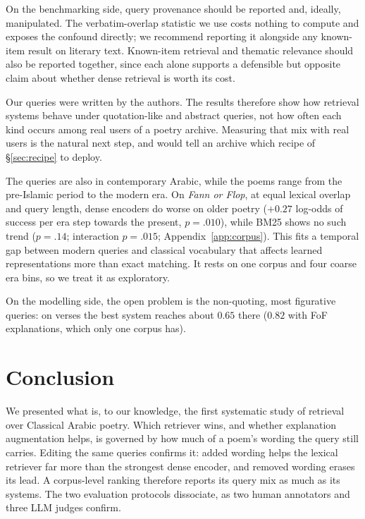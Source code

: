 \documentclass[11pt]{article}
\begin{document}
On the benchmarking side, query provenance should be reported and, ideally, manipulated. The verbatim-overlap statistic we use costs nothing to compute and exposes the confound directly; we recommend reporting it alongside any known-item result on literary text. Known-item retrieval and thematic relevance should also be reported together, since each alone supports a defensible but opposite claim about whether dense retrieval is worth its cost.

Our queries were written by the authors. The results therefore show how retrieval systems behave under quotation-like and abstract queries, not how often each kind occurs among real users of a poetry archive. Measuring that mix with real users is the natural next step, and would tell an archive which recipe of \S\ref{sec:recipe} to deploy.

The queries are also in contemporary Arabic, while the poems range from the pre-Islamic period to the modern era. On \textit{Fann or Flop}, at equal lexical overlap and query length, dense encoders do worse on older poetry ($+0.27$ log-odds of success per era step towards the present, $p{=}.010$), while BM25 shows no such trend ($p{=}.14$; interaction $p{=}.015$; Appendix~\ref{app:corpus}). This fits a temporal gap between modern queries and classical vocabulary that affects learned representations more than exact matching. It rests on one corpus and four coarse era bins, so we treat it as exploratory.

On the modelling side, the open problem is the non-quoting, most figurative queries: on verses the best system reaches about $0.65$ there ($0.82$ with FoF explanations, which only one corpus has).

\section{Conclusion}

We presented what is, to our knowledge, the first systematic study of retrieval over Classical Arabic poetry. Which retriever wins, and whether explanation augmentation helps, is governed by how much of a poem's wording the query still carries. Editing the same queries confirms it: added wording helps the lexical retriever far more than the strongest dense encoder, and removed wording erases its lead. A corpus-level ranking therefore reports its query mix as much as its systems. The two evaluation protocols dissociate, as two human annotators and three LLM judges confirm.
\end{document}
